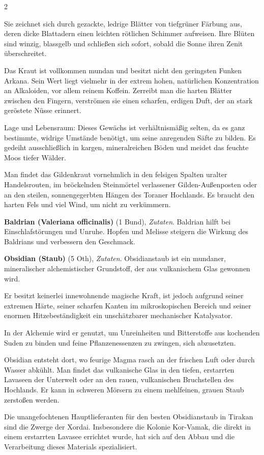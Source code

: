 \begin{multicols}{2}
\begin{denseitemize}
Sie zeichnet sich durch gezackte, ledrige Blätter von tiefgrüner Färbung aus, deren dicke Blattadern einen leichten rötlichen Schimmer aufweisen. Ihre Blüten sind winzig, blassgelb und schließen sich sofort, sobald die Sonne ihren Zenit überschreitet.

Das Kraut ist vollkommen mundan und besitzt nicht den geringsten Funken Arkana. Sein Wert liegt vielmehr in der extrem hohen, natürlichen Konzentration an Alkaloiden, vor allem reinem Koffein. Zerreibt man die harten Blätter zwischen den Fingern, verströmen sie einen scharfen, erdigen Duft, der an stark geröstete Nüsse erinnert.

Lage und Lebensraum:
Dieses Gewächs ist verhältnismäßig selten, da es ganz bestimmte, widrige Umstände benötigt, um seine anregenden Säfte zu bilden. Es gedeiht ausschließlich in kargen, mineralreichen Böden und meidet das feuchte Moos tiefer Wälder.

Man findet das Gildenkraut vornehmlich in den felsigen Spalten uralter Handelsrouten, im bröckelnden Steinmörtel verlassener Gilden-Außenposten oder an den steilen, sonnengegerbten Hängen des Toraner Hochlands. Es braucht den harten Fels und viel Wind, um nicht zu verkümmern.
        \item \textbf{Baldrian (Valeriana officinalis)} (1 Bund), \textit{Zutaten}.
        Baldrian hilft bei Einschlafstörungen und Unruhe. Hopfen und Melisse steigern die Wirkung des Baldrians und verbessern den Geschmack.
        \item \textbf{Obsidian (Staub)} (5 Oth), \textit{Zutaten}.
        Obsidianstaub ist ein mundaner, mineralischer alchemistischer Grundstoff, der aus vulkanischem Glas gewonnen wird.

Er besitzt keinerlei innewohnende magische Kraft, ist jedoch aufgrund seiner extremen Härte, seiner scharfen Kanten im mikroskopischen Bereich und seiner enormen Hitzebeständigkeit ein unschätzbarer mechanischer Katalysator.

In der Alchemie wird er genutzt, um Unreinheiten und Bitterstoffe aus kochenden Suden zu binden und feine Pflanzenessenzen zu zwingen, sich abzusetzten.

Obsidian entsteht dort, wo feurige Magma rasch an der frischen Luft oder durch Wasser abkühlt. Man findet das vulkanische Glas in den tiefen, erstarrten Lavaseen der Unterwelt oder an den rauen, vulkanischen Bruchstellen des Hochlands.
Er kann in schweren Mörsern zu einem mehlfeinen, grauen Staub zerstoßen werden.

Die unangefochtenen Hauptlieferanten für den besten Obsidianstaub in Tirakan sind die Zwerge der Xordai. Insbesondere die Kolonie Kor-Vamak, die direkt in einem erstarrten Lavasee errichtet wurde, hat sich auf den Abbau und die Verarbeitung dieses Materials spezialisiert.


\end{denseitemize}
\end{multicols}
